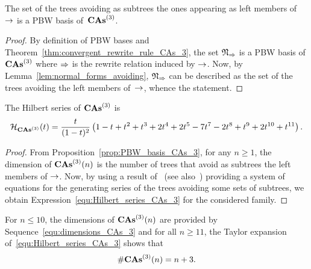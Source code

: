 \begin{Proposition} \label{prop:PBW_basis_CAs_3}
    The set of the trees avoiding as subtrees the ones appearing as
    left members of $\operatorname{\to}$ is a PBW basis of~$\mathbf{CAs}^{\left(3\right)}$.
\end{Proposition}
\begin{proof}
    By definition of PBW bases and
    Theorem~\ref{thm:convergent_rewrite_rule_CAs_3}, the set
    $\mathfrak{N}_{\operatorname{\Rightarrow}}$ is a PBW basis of $\mathbf{CAs}^{\left(3\right)}$ where
    $\operatorname{\Rightarrow}$ is the rewrite relation induced by $\operatorname{\to}$. Now, by
    Lemma~\ref{lem:normal_forms_avoiding}, $\mathfrak{N}_{\operatorname{\Rightarrow}}$
    can be described as the set of the trees avoiding the left members
    of~$\operatorname{\to}$, whence the statement.
\end{proof}
\medbreak

\begin{Proposition} \label{prop:Hilbert_series_CAs_3}
    The Hilbert series of $\mathbf{CAs}^{\left(3\right)}$ is
    \begin{equation} \label{equ:Hilbert_series_CAs_3}
        \mathcal{H}_{\mathbf{CAs}^{\left(3\right)}}(t) = \frac{t}{(1 - t)^2}
        \left(1 - t + t^2 + t^3 + 2t^4 + 2t^5 - 7t^7 - 2t^8 + t^9 +
        2t^{10} + t^{11}\right).
    \end{equation}
\end{Proposition}
\begin{proof}
    From Proposition~\ref{prop:PBW_basis_CAs_3}, for any $n \geq 1$, the
    dimension of $\mathbf{CAs}^{\left(3\right)}(n)$ is the number of trees that avoid as
    subtrees the left members of $\operatorname{\to}$. Now, by using a result
    of~\cite{Gir18} (see also~\cite{Row10,KP15}) providing a system of
    equations for the generating series of the trees avoiding some sets
    of subtrees, we obtain Expression~\eqref{equ:Hilbert_series_CAs_3}
    for the considered family.
\end{proof}
\medbreak

For $n \leq 10$, the dimensions of $\mathbf{CAs}^{\left(3\right)}(n)$ are provided by
Sequence~\eqref{equ:dimensions_CAs_3} and for all $n \geq 11$, the
Taylor expansion of~\eqref{equ:Hilbert_series_CAs_3} shows that
\begin{equation}
    \# \mathbf{CAs}^{\left(3\right)}(n) = n + 3.
\end{equation}
\medbreak

